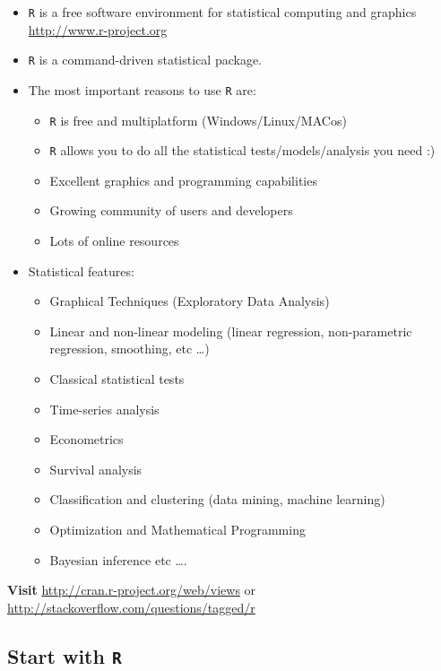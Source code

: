 \documentclass[]{article}
\numberwithin{equation}{section}
\begin{document}
\begin{itemize}
\item
  \texttt{R} is a free software environment for statistical computing
  and graphics \url{http://www.r-project.org}
\item
  \texttt{R} is a command-driven statistical package.
\item
  The most important reasons to use \texttt{R} are:

  \begin{itemize}
  \item
    \texttt{R} is free and multiplatform (Windows/Linux/MACos)
  \item
    \texttt{R} allows you to do all the statistical
    tests/models/analysis you need :)
  \item
    Excellent graphics and programming capabilities
  \item
    Growing community of users and developers
  \item
    Lots of online resources
  \end{itemize}
\item
  Statistical features:

  \begin{itemize}
  \item
    Graphical Techniques (Exploratory Data Analysis)
  \item
    Linear and non-linear modeling (linear regression, non-parametric
    regression, smoothing, etc \ldots{})
  \item
    Classical statistical tests
  \item
    Time-series analysis
  \item
    Econometrics
  \item
    Survival analysis
  \item
    Classification and clustering (data mining, machine learning)
  \item
    Optimization and Mathematical Programming
  \item
    Bayesian inference etc \ldots{}.
  \end{itemize}
\end{itemize}

\textbf{Visit} \url{http://cran.r-project.org/web/views} or
\url{http://stackoverflow.com/questions/tagged/r}

\subsection{\texorpdfstring{Start with
\texttt{R}}{Start with R}}\label{start-with-r}
\end{document}
